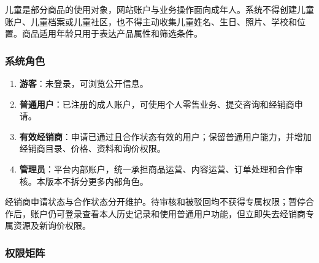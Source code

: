 儿童是部分商品的使用对象，网站账户与业务操作面向成年人。系统不得创建儿童账户、儿童档案或儿童社区，也不得主动收集儿童姓名、生日、照片、学校和位置。商品适用年龄只用于表达产品属性和筛选条件。

\subsubsection{系统角色}\label{sec:232-系统角色}

\begin{enumerate}
\item {\bfseries 游客}：未登录，可浏览公开信息。
\item {\bfseries 普通用户}：已注册的成人账户，可使用个人零售业务、提交咨询和经销商申请。
\item {\bfseries 有效经销商}：申请已通过且合作状态有效的用户；保留普通用户能力，并增加经销商目录、价格、资料和询价权限。
\item {\bfseries 管理员}：平台内部账户，统一承担商品运营、内容运营、订单处理和合作审核。本版本不拆分更多内部角色。
\end{enumerate}

经销商申请状态与合作状态分开维护。待审核和被驳回均不获得专属权限；暂停合作后，账户仍可登录查看本人历史记录和使用普通用户功能，但立即失去经销商专属资源及新询价权限。

\subsubsection{权限矩阵}\label{sec:233-权限矩阵}

